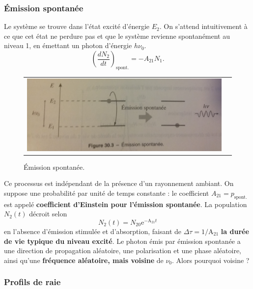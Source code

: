 \documentclass[11pt,a4paper]{report}
\begin{document}
\subsubsection{Émission spontanée}
Le système se trouve dans l'état excité d'énergie $E_2$. On s'attend intuitivement à ce que cet état ne perdure pas et que le système revienne spontanément au niveau 1, en émettant un photon d'énergie $h\nu_0$.
\begin{equation}
	\boxed{\left(\frac{dN_2}{dt} \right)_\text{spont.} = - A_{21} N_1}.
\end{equation}
\begin{figure}[h!]
\begin{center}
	\begin{tabular}{cc}
		\includegraphics[scale = 0.55]{spontanee.png}
	\end{tabular}
\end{center}
\caption{Émission spontanée.}
\end{figure}

Ce processus est indépendant de la présence d'un rayonnement ambiant. On suppose une probabilité par unité de temps constante : le coefficient $A_{21} = p_\text{spont.}$ est appelé \textbf{coefficient d'Einstein pour l'émission spontanée}. La population $N_2(t)$ décroit selon
\begin{equation}
	N_2(t) = N_{20}\text{e}^{-\text{A}_{21}t}
\end{equation}
en l'absence d'émission stimulée et d'absorption, faisant de $\Delta\tau = 1/\text{A}_{21}$ \textbf{la durée de vie typique du niveau excité}. Le photon émis par émission spontanée a une direction de propagation aléatoire, une polarisation et une phase aléatoire, ainsi qu'une \textbf{fréquence aléatoire, mais voisine} de $\nu_0$. Alors pourquoi voisine ?
 
\subsubsection{Profils de raie}
\end{document}
